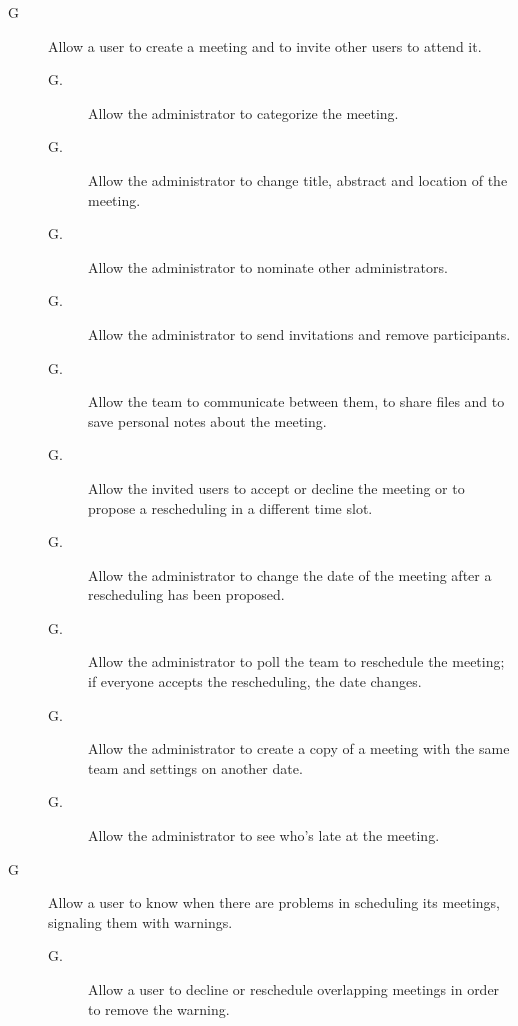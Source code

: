 \begin{description}
\item[G\thecount\label{goal:ManageMeeting}] Allow a user to create a meeting and to invite other users to attend it.
\begin{description}
\item[G\thecount.\thecountin] Allow the administrator to categorize the meeting.
\item[G\thecount.\thecountin\label{goal:EditMeeting}] Allow the administrator to change title, abstract and location of the meeting.
\item[G\thecount.\thecountin\label{goal:NominateAdmin}] Allow the administrator to nominate other administrators.
\item[G\thecount.\thecountin\label{goal:InviteUsers}] Allow the administrator to send invitations and remove participants.
\item[G\thecount.\thecountin\label{goal:ShareFiles}] Allow the team to communicate between them, to share files and to save personal notes about the meeting.
\item[G\thecount.\thecountin\label{goal:MeetingParticipation}] Allow the invited users to accept or decline the meeting or to propose a rescheduling in a different time slot.
\item[G\thecount.\thecountin\label{goal:RescheduleFromUser}] Allow the administrator to change the date of the meeting after a rescheduling has been proposed.
\item[G\thecount.\thecountin\label{goal:RescheduleFromAdmin}] Allow the administrator to poll the team to reschedule the meeting; if everyone accepts the rescheduling, the date changes.
\item[G\thecount.\thecountin\label{goal:RecreateMeeting}] Allow the administrator to create a copy of a meeting with the same team and settings on another date.
\item[G\thecount.\thecountin\label{goal:ViewLateUsers}] Allow the administrator to see who’s late at the meeting.
\end{description}

\setcounter{countin}{1}

\item[G\thecount\label{goal:Warning}] Allow a user to know when there are problems in scheduling its meetings, signaling them with warnings.
\begin{description}
\item[G\thecount.\thecountin] Allow a user to decline or reschedule overlapping meetings in order to remove the warning.
\end{description}


\end{description}
